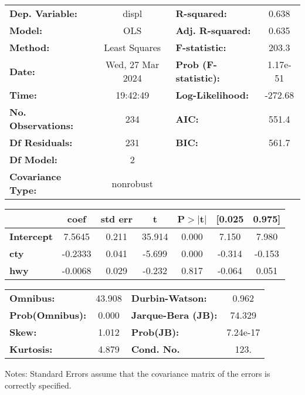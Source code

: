 \begin{center}
\begin{tabular}{lclc}
\toprule
\textbf{Dep. Variable:}    &      displ       & \textbf{  R-squared:         } &     0.638   \\
\textbf{Model:}            &       OLS        & \textbf{  Adj. R-squared:    } &     0.635   \\
\textbf{Method:}           &  Least Squares   & \textbf{  F-statistic:       } &     203.3   \\
\textbf{Date:}             & Wed, 27 Mar 2024 & \textbf{  Prob (F-statistic):} &  1.17e-51   \\
\textbf{Time:}             &     19:42:49     & \textbf{  Log-Likelihood:    } &   -272.68   \\
\textbf{No. Observations:} &         234      & \textbf{  AIC:               } &     551.4   \\
\textbf{Df Residuals:}     &         231      & \textbf{  BIC:               } &     561.7   \\
\textbf{Df Model:}         &           2      & \textbf{                     } &             \\
\textbf{Covariance Type:}  &    nonrobust     & \textbf{                     } &             \\
\bottomrule
\end{tabular}
\begin{tabular}{lcccccc}
                   & \textbf{coef} & \textbf{std err} & \textbf{t} & \textbf{P$> |$t$|$} & \textbf{[0.025} & \textbf{0.975]}  \\
\midrule
\textbf{Intercept} &       7.5645  &        0.211     &    35.914  &         0.000        &        7.150    &        7.980     \\
\textbf{cty}       &      -0.2333  &        0.041     &    -5.699  &         0.000        &       -0.314    &       -0.153     \\
\textbf{hwy}       &      -0.0068  &        0.029     &    -0.232  &         0.817        &       -0.064    &        0.051     \\
\bottomrule
\end{tabular}
\begin{tabular}{lclc}
\textbf{Omnibus:}       & 43.908 & \textbf{  Durbin-Watson:     } &    0.962  \\
\textbf{Prob(Omnibus):} &  0.000 & \textbf{  Jarque-Bera (JB):  } &   74.329  \\
\textbf{Skew:}          &  1.012 & \textbf{  Prob(JB):          } & 7.24e-17  \\
\textbf{Kurtosis:}      &  4.879 & \textbf{  Cond. No.          } &     123.  \\
\bottomrule
\end{tabular}
\end{center}

Notes: \newline
 [1] Standard Errors assume that the covariance matrix of the errors is correctly specified.